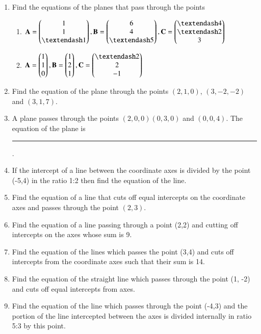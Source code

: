 \begin{enumerate}[label=\thesubsection.\arabic*,ref=\thesubsection.\theenumi]
\label{chapters/11/10/2/9}
\\
\solution

	\item Find the equations of the planes that pass through the points
\begin{enumerate}
\item $\vec{A}= \myvec{1\\1\\– 1}, \vec{B}=\myvec{6\\4\\– 5},\vec{C}= \myvec{– 4\\– 2\\3}$
\item $\vec{A}= \myvec{1\\1\\0}, \vec{B}= \myvec{1\\2\\1}, \vec{C}= \myvec{– 2\\2\\-1}$
\end{enumerate}
    \solution
		
\item Find the equation of the plane through the points $(2,1,0)$, $(3,-2,-2)$ and $(3,1,7)$.
\item A plane passes through the points $(2,0,0) (0,3,0)$ and $(0,0,4)$. The equation of the plane is \noindent\rule{2cm}{0.4pt}.
\item If the intercept of a line between the coordinate axes is divided by the point (-5,4) in the ratio 1:2 then find the equation of the line.
\item Find the equation of a line that cuts off equal intercepts on the coordinate axes and passes through the point $(2,3)$.  
	\\
\solution 
\label{chapters/11/10/2/12}

\item 
Find the equation of a line passing through a point (2,2) and cutting off intercepts on the axes whose sum is 9.
\label{chapters/11/10/2/13}
	\\
	\solution 

\item Find the equation of the lines which passes the point (3,4) and cuts off intercepts from the coordinate axes such that their sum is 14.
\item Find the equation of the straight line which passes through the point (1, -2) and cuts off equal intercepts from axes.
\item Find the equation of the line which passes through the point (-4,3) and the portion of the line intercepted between the axes is divided internally in ratio 5:3 by this point.

\end{enumerate}
